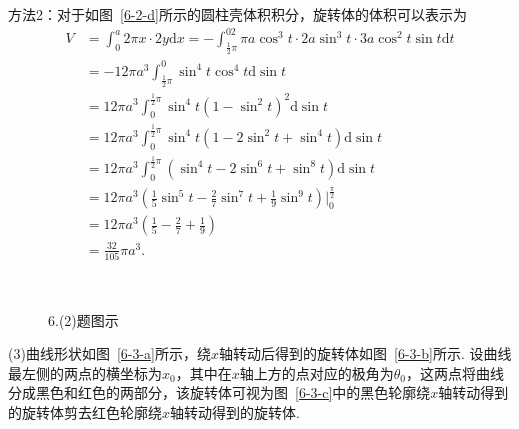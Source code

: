 \documentclass[12pt,UTF8]{ctexart}
\begin{document}
\begin{enumerate}
方法2：对于如图~\ref{6-2-d}所示的圆柱壳体积积分，旋转体的体积可以表示为
\[\begin{split}
V&=\int_0^{a}2\pi x\cdot2y\mathrm dx=-\int_{\frac12\pi}^02\pi a\cos^3t\cdot2a\sin^3t\cdot3a\cos^2t\sin t\mathrm dt\\
&=-12\pi a^3\int_{\frac12\pi}^0\sin^4t\cos^4t\mathrm d\sin t\\
&=12\pi a^3\int_0^{\frac12\pi}\sin^4t(1-\sin^2t)^2\mathrm d\sin t\\
&=12\pi a^3\int_0^{\frac12\pi}\sin^4t(1-2\sin^2t+\sin^4t)\mathrm d\sin t\\
&=12\pi a^3\int_0^{\frac12\pi}(\sin^4t-2\sin^6t+\sin^8t)\mathrm d\sin t\\
&=12\pi a^3(\frac15\sin^5t-\frac27\sin^7t+\frac19\sin^9t)\Big|_0^{\frac\pi2}\\
&=12\pi a^3(\frac15-\frac27+\frac19)\\
&=\frac{32}{105}\pi a^3.
\end{split}\]
\begin{figure}[H]
\begin{center}
    \\
    
\end{center}
\caption{6.(2)题图示}
\end{figure}
(3)曲线形状如图~\ref{6-3-a}所示，绕$x$轴转动后得到的旋转体如图~\ref{6-3-b}所示. 设曲线最左侧的两点的横坐标为$x_0$，其中在$x$轴上方的点对应的极角为$\theta_0$，这两点将曲线分成黑色和红色的两部分，该旋转体可视为图~\ref{6-3-c}中的黑色轮廓绕$x$轴转动得到的旋转体剪去红色轮廓绕$x$轴转动得到的旋转体.


\end{enumerate}
\end{document}
